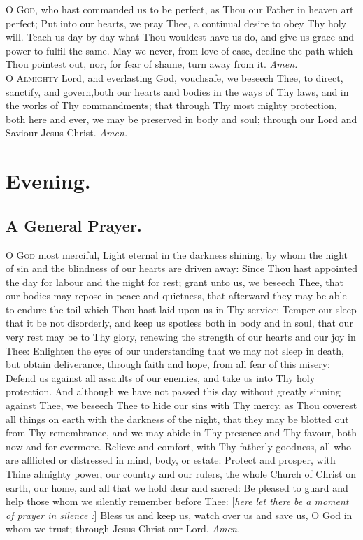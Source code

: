 \lettrine{O}{ God,} who hast commanded us to be perfect, as Thou
our Father in heaven art perfect; Put into our hearts,
we pray Thee, a continual desire to obey Thy holy will.
Teach us day by day what Thou wouldest have us do, and
give us grace and power to fulfil the same. May we never,
from love of ease, decline the path which Thou pointest
out, nor, for fear of shame, turn away from it.
\textit{Amen.} \\

\lettrine{O}{ Almighty} Lord, and everlasting God, vouchsafe, we
beseech Thee, to direct, sanctify, and govern,both our
hearts and bodies in the ways of Thy laws, and in the
works of Thy commandments; that through Thy most
mighty protection, both here and ever, we may be preserved
in body and soul; through our Lord and Saviour Jesus
Christ.
\textit{Amen.} \\

\section*{Evening.}

\subsection*{A General Prayer.}

\lettrine{O}{ God} most merciful, Light eternal in the darkness shining, by whom the night of sin and the blindness of our
hearts are driven away: Since Thou hast appointed the day
for labour and the night for rest; grant unto us, we beseech Thee, that our bodies may repose in peace and quietness, that afterward they may be able to endure the toil
which Thou hast laid upon us in Thy service: Temper our
sleep that it be not disorderly, and keep us spotless both
in body and in soul, that our very rest may be to Thy
glory, renewing the strength of our hearts and our joy in
Thee: Enlighten the eyes of our understanding that we
may not sleep in death, but obtain deliverance, through
faith and hope, from all fear of this misery: Defend us
against all assaults of our enemies, and take us into Thy
holy protection. And although we have not passed this
day without greatly sinning against Thee, we beseech
Thee to hide our sins with Thy mercy, as Thou coverest
all things on earth with the darkness of the night, that
they may be blotted out from Thy remembrance, and we
may abide in Thy presence and Thy favour, both now and
for evermore. Relieve and comfort, with Thy fatherly
goodness, all who are afflicted or distressed in mind, body,
or estate: Protect and prosper, with Thine almighty power,
our country and our rulers, the whole Church of Christ on
earth, our home, and all that we hold dear and sacred: Be
pleased to guard and help those whom we silently remember before Thee:
[\textit{here let there be a moment of prayer in silence :}]
Bless us and keep us, watch over us and save us,
O God in whom we trust; through Jesus Christ our Lord.
\textit{Amen.} \\


